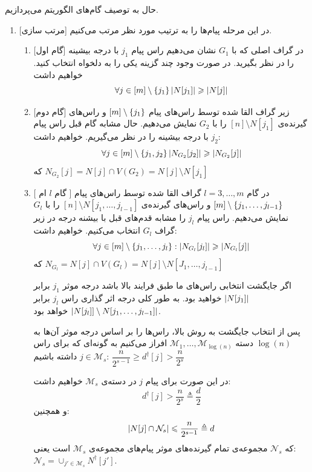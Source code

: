 حال به توصیف گام‌های الگوریتم می‌پردازیم.
\begin{enumerate}
	\item{[مرتب سازی]}
	در این مرحله پیام‌ها را به ترتیب مورد نظر مرتب می‌کنیم.
		\begin{enumerate}
			\item{[گام اول]}
			در گراف اصلی که با
			$G_1$
			نشان می‌دهیم راس پیام
			$j_1$
			با درجه بیشینه را در نظر بگیرید. در صورت وجود چند گزینه یکی را به دلخواه انتخاب کنید. خواهیم داشت
			$$\forall j \in [m] \setminus \left\{ j_1 \right\} \left|{N[j_1]}\right| \geqslant \left|{N[j]}\right|$$
			\item{[گام دوم]}
			زیر گراف القا شده توسط راس‌های پیام
			$[m] \setminus \left\{ j_1 \right\}$
			و راس‌های گیرنده‌ی
			$[n] \setminus N[j_1]$
			را با
		   $G_2$
		   نمایش می‌دهیم. حال مشابه گام قبل راس پیام
		   $j_2$
		   با درجه بیشینه را در نظر می‌گیریم. خواهیم داشت:
		   $$\forall j \in [m] \setminus \left\{ j_1, j_2 \right\} \left|{N_{G_2}[j_2]}\right| \geqslant \left|{N_{G_2}[j]}\right|$$
		   که
		   $N_{G_2}[j] = N[j] \cap V(G_2) = N[j] \setminus N[j_1]$
			\item{[
			گام $l$ ام
			]}
			در گام
			$l = 3, \ldots, m$
			گراف القا شده توسط راس‌های پیام
			$[m] \setminus \left\{ j_1, \ldots, j_{l - 1} \right\}$
			و راس‌های گیرنده‌ی
			$[n] \setminus N[j_1, \ldots, j_{l-1} ]$
			را با
			$G_l$
			نمایش می‌دهیم. راس پیام
			$j_l$
			را مشابه قدم‌های قبل با بیشنه درجه در زیر گراف
			$G_l$
			 انتخاب می‌کنیم. خواهیم داشت:
			 $$\forall j \in [m] \setminus \left\{ j_1, \ldots, j_l \right\}: \left|{N_{G_l}[j_l]}\right| \geqslant \left|{N_{G_l} [j]}\right|$$
			 که
			 $N_{G_l} = N[j] \cap V(G_l) = N[j] \setminus N[J_1, \ldots, j_{l - 1}] $
			
			اگر جایگشت انتخابی راس‌های ما طبق فرایند بالا باشد درجه موثر 
			$j_1$
			برابر
			$\left|{N[j_1]}\right|$
			 خواهید بود. به طور کلی درجه اثر گذاری راس
			 $j_l$
			 برابر
			 $\left|{N[j_l]]\setminus N[j_1, \ldots, j_{l-1}]}\right|$
			 خواهد بود.
			 
			 پس از انتخاب جایگشت به روش بالا، راس‌ها را بر اساس درجه موثر آن‌ها به
			 $\log(n)$
			 دسته 
			 $\mathcal{M}_1, \ldots, \mathcal{M}_{\log(n)}$
			 افراز می‌کنیم به گونه‌ای که برای راس
			 $j \in \mathcal{M}_s$
			 داشته باشیم:
			 $\dfrac{n}{2^{s - 1}} \geq d^\dagger[j] > \dfrac{n}{2^s}$
			 
			 در این صورت برای پیام
			 $j$
			 در دسته‌ی
			 $\mathcal{M}_s$
			 خواهیم داشت:
			 $$d^{\dagger}[j] > \dfrac{n}{2^s} \triangleq \dfrac{d}{2}$$
			 و همچنین:
			 $$\left|{N[j] \cap \mathcal{N}_s}\right| \leqslant \dfrac{n}{2^{s - 1}} \triangleq d$$
			 که
			 $\mathcal{N}_s$
			 مجموعه‌ی تمام گیرنده‌های موثر پیام‌های مجموعه‌ی
			 $\mathcal{M}_s$
			 است یعنی:
			 $\mathcal{N}_s = \cup_{j' \in \mathcal{M}_s} N^{\dagger}[j']$.
			 

\end{enumerate}
\end{enumerate}
